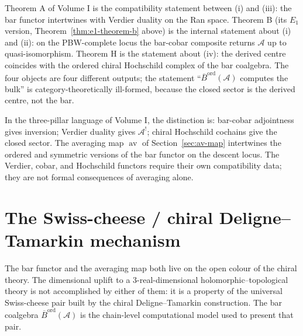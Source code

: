 \documentclass[11pt,reqno]{amsart}
\theoremstyle{definition}
\theoremstyle{remark}
\newcommand{\cA}{\mathcal{A}}
\newcommand{\Barord}{\overline{B}^{\mathrm{ord}}}
\newcommand{\av}{\operatorname{av}}
\numberwithin{equation}{section}
\begin{document}
Theorem A of Volume I is the compatibility statement between (i)
and (iii): the bar functor intertwines with Verdier duality on
the Ran space. Theorem B (its $E_{1}$ version,
Theorem~\ref{thm:e1-theorem-b} above) is the internal statement
about (i) and (ii): on the PBW-complete locus the bar-cobar
composite returns $\cA$ up to quasi-isomorphism. Theorem H is the
statement about (iv): the derived centre coincides with the
ordered chiral Hochschild complex of the bar coalgebra. The four
objects are four different outputs; the statement
``$\Barord(\cA)$ computes the bulk'' is category-theoretically
ill-formed, because the closed sector is the derived centre, not the bar.

\medskip

In the three-pillar language of Volume I, the distinction is:
bar-cobar adjointness gives inversion; Verdier duality gives
$\cA^{!}$; chiral Hochschild cochains give the closed sector. The averaging map
$\av$ of Section~\ref{sec:av-map} intertwines the ordered and
symmetric versions of the bar functor on the descent locus. The
Verdier, cobar, and Hochschild functors require their own
compatibility data; they are not formal consequences of averaging
alone.

\section{The Swiss-cheese / chiral Deligne--Tamarkin mechanism}
\label{sec:swiss-cheese-DT}

The bar functor and the averaging map both live on the open colour
of the chiral theory. The dimensional uplift to a
$3$-real-dimensional holomorphic--topological theory is not
accomplished by either of them: it is a property of the universal
Swiss-cheese pair built by the chiral Deligne--Tamarkin
construction. The bar coalgebra $\Barord(\cA)$ is the chain-level
computational model used to present that pair.
\end{document}
